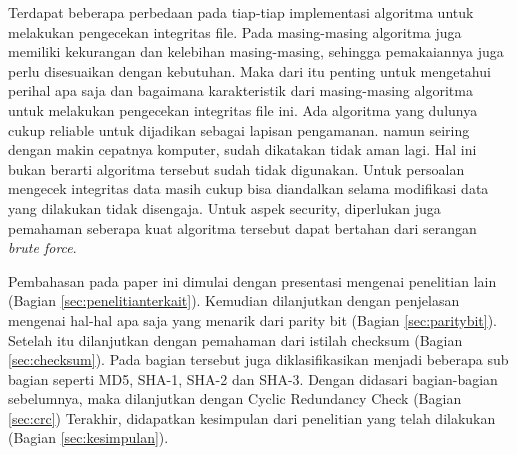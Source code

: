 Terdapat beberapa perbedaan pada tiap-tiap implementasi algoritma untuk melakukan pengecekan integritas file. Pada masing-masing algoritma juga memiliki kekurangan dan kelebihan masing-masing, sehingga pemakaiannya juga perlu disesuaikan dengan kebutuhan. Maka dari itu penting untuk mengetahui perihal apa saja dan bagaimana karakteristik dari masing-masing algoritma untuk melakukan pengecekan integritas file ini. Ada algoritma yang dulunya cukup reliable untuk dijadikan sebagai lapisan pengamanan. namun seiring dengan makin cepatnya komputer, sudah dikatakan tidak aman lagi. Hal ini bukan berarti algoritma tersebut sudah tidak digunakan. Untuk persoalan mengecek integritas data masih cukup bisa diandalkan selama modifikasi data yang dilakukan tidak disengaja. Untuk aspek security, diperlukan juga pemahaman seberapa kuat algoritma tersebut dapat bertahan dari serangan \emph{brute force}.

Pembahasan pada paper ini dimulai dengan presentasi mengenai penelitian lain (Bagian \ref{sec:penelitianterkait}).
Kemudian dilanjutkan dengan penjelasan mengenai hal-hal apa saja yang menarik dari parity bit (Bagian \ref{sec:paritybit}).
Setelah itu dilanjutkan dengan pemahaman dari istilah checksum (Bagian \ref{sec:checksum}). Pada bagian tersebut juga diklasifikasikan menjadi beberapa sub bagian seperti MD5, SHA-1, SHA-2 dan SHA-3.
Dengan didasari bagian-bagian sebelumnya, maka dilanjutkan dengan Cyclic Redundancy Check  (Bagian \ref{sec:crc})
Terakhir, didapatkan kesimpulan dari penelitian yang telah dilakukan (Bagian \ref{sec:kesimpulan}).
